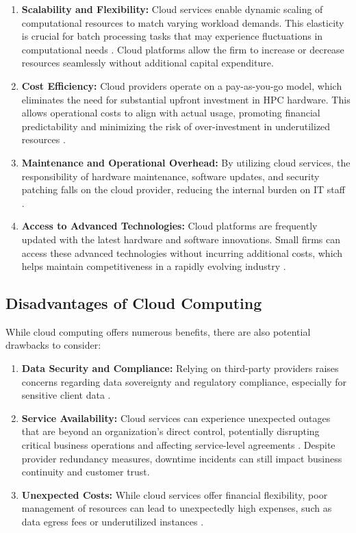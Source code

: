 \documentclass{article}
\begin{document}
\begin{enumerate}
    \item \textbf{Scalability and Flexibility:} Cloud services enable dynamic scaling of computational resources to match varying workload demands. This elasticity is crucial for batch processing tasks that may experience fluctuations in computational needs \parencite{armbrust2010cloud}. Cloud platforms allow the firm to increase or decrease resources seamlessly without additional capital expenditure.

    \item \textbf{Cost Efficiency:} Cloud providers operate on a pay-as-you-go model, which eliminates the need for substantial upfront investment in HPC hardware. This allows operational costs to align with actual usage, promoting financial predictability and minimizing the risk of over-investment in underutilized resources \parencite{li2019decision}.

    \item \textbf{Maintenance and Operational Overhead:} By utilizing cloud services, the responsibility of hardware maintenance, software updates, and security patching falls on the cloud provider, reducing the internal burden on IT staff \parencite{marinescu2013cloud}.

    \item \textbf{Access to Advanced Technologies:} Cloud platforms are frequently updated with the latest hardware and software innovations. Small firms can access these advanced technologies without incurring additional costs, which helps maintain competitiveness in a rapidly evolving industry \parencite{dillon2010cloud}.
\end{enumerate}

\subsection{Disadvantages of Cloud Computing}

While cloud computing offers numerous benefits, there are also potential drawbacks to consider:

\begin{enumerate}
    \item \textbf{Data Security and Compliance:} Relying on third-party providers raises concerns regarding data sovereignty and regulatory compliance, especially for sensitive client data \parencite{hashem2015bigdata}.

    \item \textbf{Service Availability:} Cloud services can experience unexpected outages that are beyond an organization's direct control, potentially disrupting critical business operations and affecting service-level agreements \parencite{Ibrahim2024}. Despite provider redundancy measures, downtime incidents can still impact business continuity and customer trust.

    \item \textbf{Unexpected Costs:} While cloud services offer financial flexibility, poor management of resources can lead to unexpectedly high expenses, such as data egress fees or underutilized instances \parencite{rehman2018cloud}.
\end{enumerate}
\end{document}
